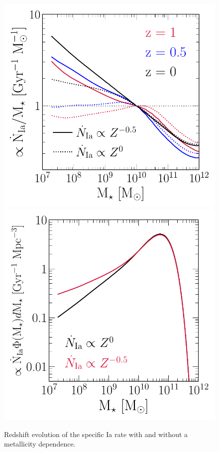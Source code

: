 \documentclass[ms.tex]{subfiles}
\begin{document}
\begin{figure}
\centering
\includegraphics[scale = 0.55]{umachine_iarate_redshiftevol.pdf}
\includegraphics[scale = 0.55]{ia_massdist.pdf}
\caption{
Redshift evolution of the specific Ia rate with and without a metallicity
dependence.
}
\label{fig:specia_zdep}
\end{figure}
\end{document}
